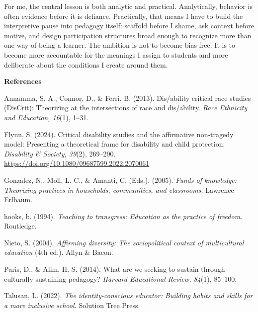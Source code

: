 \documentclass[12pt]{article}
\newcommand{\levelone}[1]{\begin{center}\textbf{#1}\end{center}}
\newcommand{\reference}[1]{\noindent\hangindent=0.5in\hangafter=1 #1\par}
\begin{document}
For me, the central lesson is both analytic and practical. Analytically, behavior is often evidence before it is defiance. Practically, that means I have to build the interpretive pause into pedagogy itself: scaffold before I shame, ask context before motive, and design participation structures broad enough to recognize more than one way of being a learner. The ambition is not to become bias-free. It is to become more accountable for the meanings I assign to students and more deliberate about the conditions I create around them.

\newpage
\levelone{References}

\reference{Annamma, S. A., Connor, D., \& Ferri, B. (2013). Dis/ability critical race studies (DisCrit): Theorizing at the intersections of race and dis/ability. \textit{Race Ethnicity and Education, 16}(1), 1--31.}

\reference{Flynn, S. (2024). Critical disability studies and the affirmative non-tragedy model: Presenting a theoretical frame for disability and child protection. \textit{Disability \& Society, 39}(2), 269--290. \url{https://doi.org/10.1080/09687599.2022.2070061}}

\reference{Gonzalez, N., Moll, L. C., \& Amanti, C. (Eds.). (2005). \textit{Funds of knowledge: Theorizing practices in households, communities, and classrooms.} Lawrence Erlbaum.}

\reference{hooks, b. (1994). \textit{Teaching to transgress: Education as the practice of freedom.} Routledge.}

\reference{Nieto, S. (2004). \textit{Affirming diversity: The sociopolitical context of multicultural education} (4th ed.). Allyn \& Bacon.}

\reference{Paris, D., \& Alim, H. S. (2014). What are we seeking to sustain through culturally sustaining pedagogy? \textit{Harvard Educational Review, 84}(1), 85--100.}

\reference{Talusan, L. (2022). \textit{The identity-conscious educator: Building habits and skills for a more inclusive school.} Solution Tree Press.}
\end{document}
